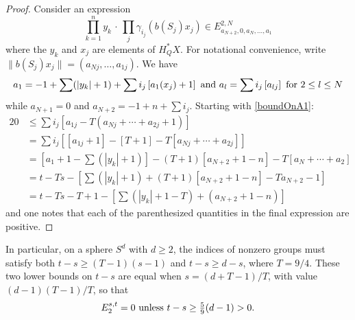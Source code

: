 \documentclass[10pt]{article}
\begin{document}
\begin{VanishingLines}
\begin{proof}
Consider an expression 
\[\prod_{k=1}^ny_k\,\cdot\,\prod_j\gamma_{i_j}(b(S_j)x_j)\in E^{2,N}_{a_{N+2},0,a_N,\ldots,a_1}\]
where the $y_k$ and $x_j$ are elements of $H^*_QX$. For notational convenience, write $\|b(S_j)x_j\|=(a_{Nj},\ldots,a_{1j})$. We have
\[a_1=-1+\sum(|y_k|+1)+\sum i_j\left[a_1(x_j)+1\right]\textup{ and }a_l=\sum i_j\left[a_{lj}\right]\textup{ for $2\leq l\leq N$}\]
while $a_{N+1}=0$ and $a_{N+2}=-1+n+\sum i_j$. Starting with \ref{boundOnA1}:
\begin{alignat*}{2}
0
&\leq
\sum i_j\left[a_{1j}-T(a_{Nj}+\cdots +a_{2j}+1)\right]%
\\
&=
\sum i_j\left[[a_{1j}+1]-[T+1]-T[a_{Nj}+\cdots +a_{2j}]\right]%
\\
&=
[a_1+1-\sum(|y_k|+1)]-(T+1)[a_{N+2}+1-n]-T[a_N+\cdots +a_2]\\%
&=t-Ts-\left[\sum(|y_k|+1)+(T+1)[a_{N+2}+1-n]-Ta_{N+2}-1\right]\\%
&=t-Ts-T+1-\left[\sum(|y_k|+1-T)+(a_{N+2}+1-n)\right]
\end{alignat*}
and one notes that each of the parenthesized quantities in the final expression are positive.
\end{proof}

In particular, on a sphere $S^d$ with $d\geq2$, the indices of nonzero groups must satisfy both $t-s\geq(T-1)(s-1)$ and $t-s\geq d-s$, where $T=9/4$. These two lower bounds on $t-s$ are equal when $s=(d+T-1)/T$, with value $(d-1)(T-1)/T$, so that
\[E_2^{s,t}=0\textup{\ unless $t-s\geq \tfrac{5}{9}(d-1)>0$.}\]

\end{VanishingLines}
\end{document}
